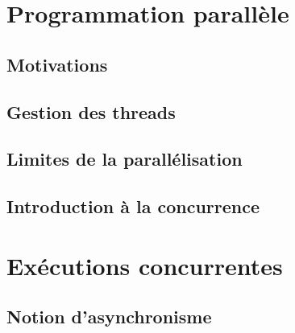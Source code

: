  
\section{Programmation parallèle}
 
\subsection{Motivations}





 
\subsection{Gestion des threads}








 
\subsection{Limites de la parallélisation}




 
\subsection{Introduction à la concurrence}





 
 
\section{Exécutions concurrentes}
 
\subsection{Notion d'asynchronisme}


 
